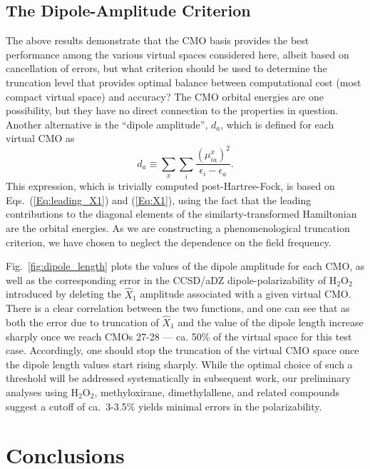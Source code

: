 \subsection{The Dipole-Amplitude Criterion}

The above results demonstrate that the CMO basis provides the best performance
among the various virtual spaces considered here, albeit based on cancellation
of errors, but what criterion should be used to determine the truncation level
that provides optimal balance between computational cost (most compact virtual
space) and accuracy?  The CMO orbital energies are one possibility, but they
have no direct connection to the properties in question.  Another alternative
is the ``dipole amplitude'', $d_a$, which is defined for each virtual CMO as
\begin{equation}
d_a \equiv \sum\limits_x\sum\limits_i\frac{({\mu^x_{ia}})^2}{\epsilon_i - \epsilon_a}.
\label{Eq:dipole}
\end{equation}
This expression, which is trivially computed post-Hartree-Fock, is based on
Eqs.~(\ref{Eq:leading_X1}) and (\ref{Eq:X1}), using the fact that the leading
contributions to the diagonal elements of the similarty-transformed
Hamiltonian are the orbital energies.    As we are constructing a
phenomenological truncation criterion, we have chosen to neglect the
dependence on the field frequency.

Fig.~\ref{fig:dipole_length} plots the values of the dipole amplitude for
each CMO, as well as the corresponding error in the CCSD/aDZ
dipole-polarizability of H$_2$O$_2$ introduced by deleting the $\hat{X}_1$
amplitude associated with a given virtual CMO. There is a clear correlation
between the two functions, and one can see that as both the error due to
truncation of $\hat{X}_1$ and the value of the dipole length increase sharply
once we reach CMOs 27-28 --- ca. 50\% of the virtual space for this test case.
Accordingly, one should stop the truncation of the virtual CMO space once the
dipole length values start rising sharply.  While the optimal choice of
such a threshold will be addressed systematically in subsequent work, our
preliminary analyses using H$_2$O$_2$, methyloxirane, dimethylallene, and
related compounds suggest a cutoff of ca.\ 3-3.5\% yields minimal errors
in the polarizability.

\section{Conclusions}

